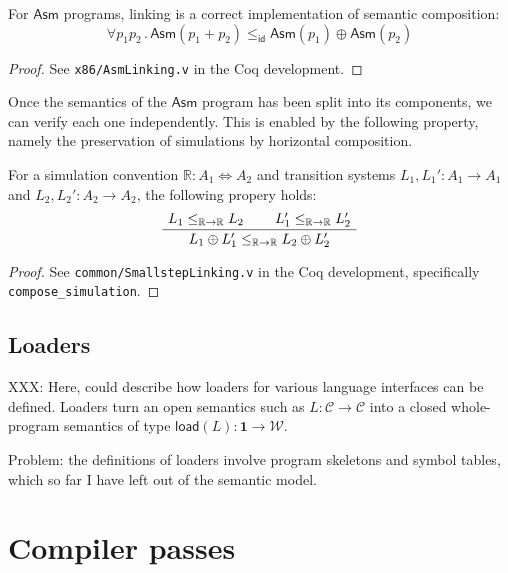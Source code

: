 \documentclass[sigplan,10pt,review,anonymous]{acmart}
\newcommand{\kw}[1]{\ensuremath{ \mathsf{#1} }}
\begin{document}
\begin{theorem} \label{thm:asmlinking} %
For \kw{Asm} programs,
linking is a correct implementation of
semantic composition:
\[
    \forall p_1 p_2 \,.\,
      \kw{Asm}(p_1 + p_2) \le_\kw{id}
      \kw{Asm}(p_1) \oplus \kw{Asm}(p_2)
\]
\begin{proof}
See \texttt{x86/AsmLinking.v} in the Coq development.
\end{proof}
\end{theorem}

Once the semantics of the \kw{Asm} program
has been split into its components,
we can verify each one independently.
This is enabled by the following property,
namely the preservation of simulations by
horizontal composition.

\begin{theorem} \label{thm:simlinking} %
For a simulation convention
$\mathbb{R} : A_1 \Leftrightarrow A_2$
and transition systems
$L_1, L_1' : A_1 \rightarrow A_1$ and
$L_2, L_2' : A_2 \rightarrow A_2$,
the following propery holds:
\[
    \AxiomC{$L_1 \le_{\mathbb{R} \rightarrow \mathbb{R}} L_2$}
    \AxiomC{$L_1' \le_{\mathbb{R} \rightarrow \mathbb{R}} L_2'$}
    \BinaryInfC{$L_1 \oplus L_1' \le_{\mathbb{R} \rightarrow \mathbb{R}} L_2 \oplus L_2'$}
    \DisplayProof
\]
\begin{proof}
See \texttt{common/SmallstepLinking.v}
in the Coq development,
specifically \texttt{compose\_simulation}.
\end{proof}
\end{theorem}


\subsection{Loaders} \label{sec:sem:loader} %

XXX: Here, could describe how loaders for various language
interfaces can be defined.
Loaders turn an open semantics such as
$L : \mathcal{C} \rightarrow \mathcal{C}$
into a closed whole-program semantics of type
$\kw{load}(L) : \mathbf{1} \rightarrow \mathcal{W}$.

Problem: the definitions of loaders involve
program skeletons and symbol tables,
which so far I have left out of the semantic model.



\newpage
\section{Compiler passes} \label{sec:passes} %
\end{document}

